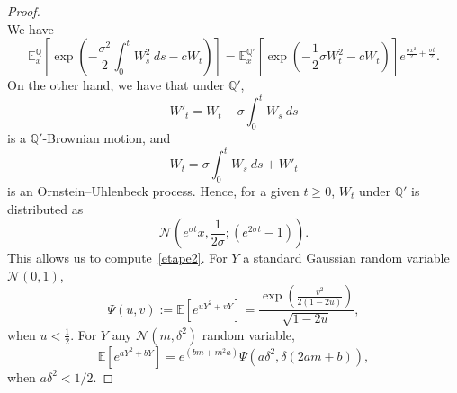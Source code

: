 \documentclass[AHL,Unicode,longabstracts,published]{cedram}
\renewcommand{\No}{\mathcal{N}}
\newcommand*\E{\mathbb{E}}
\newcommand{\bbQ}{\mathbb{Q}}
\begin{document}
\begin{proof}
\[\]
We have
\begin{equation}\label{etape2}
\E_{x}^{\bbQ}\left[\exp\left(-\frac{\sigma^2}{2}\int_{0}^{t} W_{s}^2\ ds -cW_{t}\right)\right]=\E_{x}^{\bbQ'}\left[\exp\left(-\frac{1}{2}\sigma W_{t}^2-c W_{t} \right) \right]e^{\frac{\sigma x^2}{2}+\frac{\sigma t}{2}}.
\end{equation}
On the other hand, we have that under $\bbQ'$,
\[
W'_t=W_{t}-\sigma\int_{0}^{t}W_{s}\ ds
\]
is a $\bbQ'$-Brownian motion, and
\[
W_{t}=\sigma\int_{0}^{t}W_{s}\ ds+W'_{t}
\]
is an Ornstein--Uhlenbeck process. Hence, for a given $t\geq 0$, $W_t$ under $\bbQ'$ is distributed as
\[
\No\left(e^{\sigma t}x,\frac{1}{2\sigma};\left(e^{2\sigma t}-1\right) \right).
\]
This allows us to compute~\eqref{etape2}. For $Y$ a standard Gaussian random variable $\No(0,1)$,
\[
\Psi(u,v):=\E\left[e^{uY^2+vY} \right] =\frac{\exp\left(\frac{v^2}{2(1-2u)} \right)}{\sqrt{1-2u}},
\]
when $u<\tfrac{1}{2}$. For $Y$ any $\No(m,\delta^2)$ random variable,
\[
\E\left[e^{aY^2+bY} \right]=e^{\left(bm+m^2a\right)}\Psi\left(a\delta^2,\delta(2am+b)\right),
\]
when $a \delta^2 <1/2$.




\end{proof}
\end{document}
